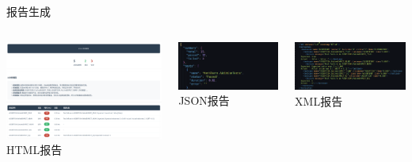 \documentclass{beamer}
\begin{document}
\begin{frame}{报告生成}
    \begin{columns}
        \begin{column}{0.33\textwidth}
            \centering
            \includegraphics[width=\textwidth]{img/html.png}
            HTML报告
        \end{column}
        \begin{column}{0.33\textwidth}
            \centering
            \includegraphics[width=\textwidth]{img/json.png}
            JSON报告
        \end{column}
        \begin{column}{0.33\textwidth}
            \centering
            \includegraphics[width=\textwidth]{img/xml.png}
            XML报告
        \end{column}
    \end{columns}
\end{frame}
\end{document}
